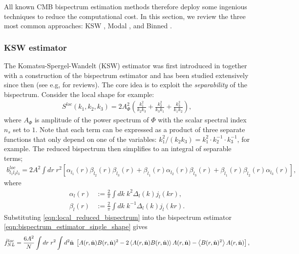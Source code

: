 All known CMB bispectrum estimation methods therefore deploy some ingenious techniques to reduce the computational cost. In this section, we review the three most common approaches: KSW \cite{Komatsu2005,Creminelli2006limits}, Modal \cite{Fergusson2010general,Fergusson2012}, and Binned \cite{Bucher2010,Bucher2016}.

\subsubsection*{KSW estimator}
The Komatsu-Spergel-Wandelt (KSW) estimator was first introduced in \cite{Komatsu2005} together with a construction of the bispectrum estimator and has been studied extensively since then \cite{Creminelli2006limits,Babich2005optimal,Creminelli2007estimators} (see e.g, \cite{Komatsu2010} for reviews). The core idea is to exploit the \textit{separability} of the bispectrum. Consider the local shape for example:
\begin{align}
	S^{loc}(k_1, k_2, k_3) = 2A_\Phi^2 \left( \frac{k_1^2}{k_2 k_3} + \frac{k_2^2}{k_3 k_1} +  \frac{k_3^2}{k_1 k_2} \right),
\end{align}
where $A_\Phi$ is amplitude of the power spectrum of $\Phi$ with the scalar spectral index $n_s$ set to $1$. Note that each term can be expressed as a product of three separate functions that only depend on one of the variables: $k_1^2/(k_2 k_3) = k_1^2 \cdot k_2^{-1} \cdot k_3^{-1}$, for example. The reduced bispectrum then simplifies to an integral of separable terms;
\begin{align}
	b^{loc}_{l_1 l_2 l_3} = 2A^2 \int dr \; r^2 \left[ \alpha_{l_1}(r) \beta_{l_2}(r) \beta_{l_3}(r) + \beta_{l_1}(r) \alpha_{l_2}(r) \beta_{l_3}(r) + \beta_{l_1}(r) \beta_{l_2}(r) \alpha_{l_3}(r) \right], \label{eqn:local_reduced_bispectrum}
\end{align}
where
\begin{align}
	\alpha_l(r) &:= \frac{2}{\pi} \int dk \; k^2 \Delta_l(k) j_l(kr), \label{def:KSW_estimator_alpha}\\
	\beta_l(r) &:= \frac{2}{\pi} \int dk \; k^{-1} \Delta_l(k) j_l(kr). \label{def:KSW_estimator_beta}
\end{align}
Substituting \eqref{eqn:local_reduced_bispectrum} into the bispectrum estimator \eqref{eqn:bispectrum_estimator_single_shape} gives
\begin{align}
	\hat{f}^{loc}_{NL} = \frac{6A^2}{N} \int dr \; r^2 \int d^2 \hat{\mathbf{n}} \; \left[ A(r,\hat{\mathbf{n}}) B(r,\hat{\mathbf{n}})^2 - 2 \left <A(r,\hat{\mathbf{n}}) B(r,\hat{\mathbf{n}}) \right> A(r,\hat{\mathbf{n}}) - \left< B(r,\hat{\mathbf{n}})^2 \right> A(r,\hat{\mathbf{n}})  \right], \label{eqn:KSW_estimator_local}
\end{align}
